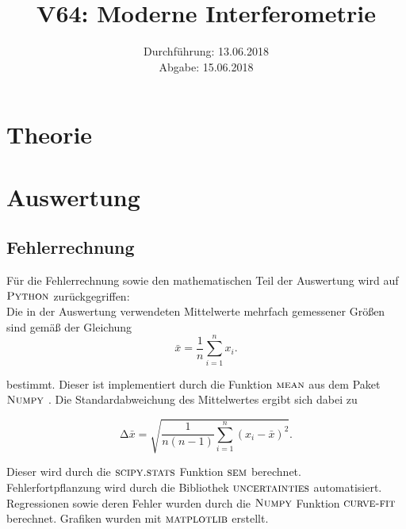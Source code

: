 \documentclass[
  bibliography=totoc,     %
  captions=tableheading,  %
  titlepage=firstiscover, %
]{scrartcl}
\title{V64: Moderne Interferometrie}
\author{
  Simon Schulte
  \texorpdfstring{
    \\
    \href{mailto:simon.schulte@udo.edu}{simon.schulte@udo.edu}
  }{}
  \texorpdfstring{\and}{, }
  Tim Sedlaczek
  \texorpdfstring{
    \\
    \href{mailto:tim.sedlaczek@udo.edu}{tim.sedlaczek@udo.edu}
  }{}
}
\date{Durchführung: 13.06.2018\\
      Abgabe: 15.06.2018}
\begin{document}
\maketitle
\thispagestyle{empty}
\setcounter{page}{1}
\section{Theorie}
\label{sec:theorie}


\section{Auswertung}
\label{sec:auswertung}


\subsection{Fehlerrechnung}
\label{sec:fehlerrechnung}
Für die Fehlerrechnung sowie den mathematischen Teil der Auswertung wird auf
  $\textsc{Python}$ \cite{python} zurückgegriffen:\\
Die in der Auswertung verwendeten Mittelwerte mehrfach gemessener Größen sind
gemäß der Gleichung
\begin{equation}
    \bar{x}=\frac{1}{n}\sum_{i=1}^n x_i.
    \label{eq:mittelwert}
\end{equation}

bestimmt. Dieser ist implementiert durch die Funktion $\textsc{mean}$ aus dem Paket
  $\textsc{Numpy}$ \cite{numpy}. Die Standardabweichung des Mittelwertes ergibt sich dabei zu

\begin{equation}
    \mathup{\Delta}\bar{x}=\sqrt{\frac{1}{n(n-1)}\sum_{i=1}^n\left(x_i-\bar{x}\right)^2}.
    \label{eq:standardabweichung}
\end{equation}

Dieser wird durch die
$\textsc{scipy.stats}$ \cite{scipy} Funktion $\textsc{sem}$ berechnet.\\
Fehlerfortpflanzung wird
durch die Bibliothek $\textsc{uncertainties}$ \cite{uncertainties} automatisiert.
Regressionen sowie deren Fehler wurden durch die $\textsc{Numpy}$
Funktion $\textsc{curve-fit}$ berechnet.
Grafiken wurden mit $\textsc{matplotlib}$ \cite{matplotlib}
erstellt.
\end{document}
